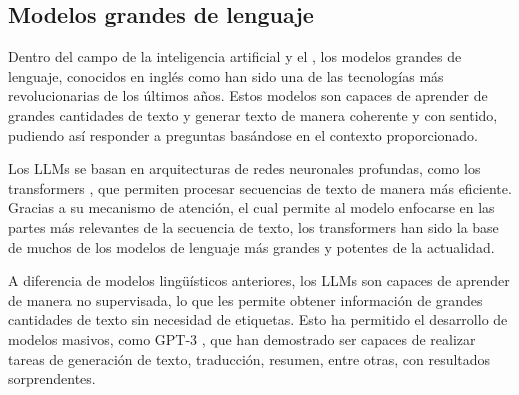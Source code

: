 \subsection{Modelos grandes de lenguaje}
Dentro del campo de la inteligencia artificial y el , los modelos grandes de lenguaje, conocidos en inglés como  han sido una de las tecnologías más revolucionarias de los últimos años. Estos modelos son capaces de aprender de grandes cantidades de texto y generar texto de manera coherente y con sentido, pudiendo así responder a preguntas basándose en el contexto proporcionado.

Los \ac{LLM}s se basan en arquitecturas de redes neuronales profundas, como los transformers \cite{attention2017}, que permiten procesar secuencias de texto de manera más eficiente. Gracias a su mecanismo de atención, el cual permite al modelo enfocarse en las partes más relevantes de la secuencia de texto, los transformers han sido la base de muchos de los modelos de lenguaje más grandes y potentes de la actualidad.

A diferencia de modelos lingüísticos anteriores, los \ac{LLM}s son capaces de aprender de manera no supervisada, lo que les permite obtener información de grandes cantidades de texto sin necesidad de etiquetas. Esto ha permitido el desarrollo de modelos masivos, como GPT-3 \cite{gpt32020}, que han demostrado ser capaces de realizar tareas de generación de texto, traducción, resumen, entre otras, con resultados sorprendentes.